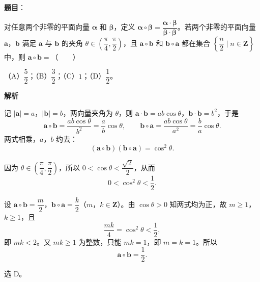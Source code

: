 \begin{answer}

\textbf{题目}：

对任意两个非零的平面向量 $\boldsymbol\alpha$ 和 $\boldsymbol\beta$，定义 $\boldsymbol\alpha\circ\boldsymbol\beta=\dfrac{\boldsymbol\alpha\cdot\boldsymbol\beta}{\boldsymbol\beta\cdot\boldsymbol\beta}$。若两个非零的平面向量 $\boldsymbol a$，$\boldsymbol b$ 满足 $\boldsymbol a$ 与 $\boldsymbol b$ 的夹角 $\theta\in\left(\dfrac\pi4,\dfrac\pi2\right)$，且 $\boldsymbol a\circ\boldsymbol b$ 和 $\boldsymbol b\circ\boldsymbol a$ 都在集合 $\left\{\dfrac n2\mid n\in\mathbf Z\right\}$ 中，则 $\boldsymbol a\circ\boldsymbol b=$\mbox{（　　）}

（A）$\dfrac52$；（B）$\dfrac32$；（C）$1$；（D）$\dfrac12$。

\textbf{解析}

记 $|\boldsymbol a|=a$，$|\boldsymbol b|=b$，两向量夹角为 $\theta$，则 $\boldsymbol a\cdot\boldsymbol b=ab\cos\theta$，$\boldsymbol b\cdot\boldsymbol b=b^2$，于是
\nopagebreak[4]
\[\boldsymbol a\circ\boldsymbol b=\frac{ab\cos\theta}{b^2}=\frac ab\cos\theta,\qquad
\boldsymbol b\circ\boldsymbol a=\frac{ab\cos\theta}{a^2}=\frac ba\cos\theta.\]
两式相乘，$a$，$b$ 约去：
\nopagebreak[4]
\[(\boldsymbol a\circ\boldsymbol b)(\boldsymbol b\circ\boldsymbol a)=\cos^2\theta.\]

因为 $\theta\in\left(\dfrac\pi4,\dfrac\pi2\right)$，所以 $0<\cos\theta<\dfrac{\sqrt2}{2}$，从而
\nopagebreak[4]
\[0<\cos^2\theta<\frac12.\]

设 $\boldsymbol a\circ\boldsymbol b=\dfrac m2$，$\boldsymbol b\circ\boldsymbol a=\dfrac k2$（$m$，$k\in\mathbf Z$）。由 $\cos\theta>0$ 知两式均为正，故 $m\geqslant1$，$k\geqslant1$，且
\nopagebreak[4]
\[\frac{mk}{4}=\cos^2\theta<\frac12,\]
即 $mk<2$。又 $mk\geqslant1$ 为整数，只能 $mk=1$，即 $m=k=1$。所以
\nopagebreak[4]
\[\boldsymbol a\circ\boldsymbol b=\frac12.\]

选 D。


\end{answer}
